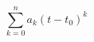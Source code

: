 \documentclass[12pt]{article}
\begin{document}
\begin{displaymath}
\sum_{k=0}^n a_k (t-t_0)^k
\end{displaymath}
\end{document}
